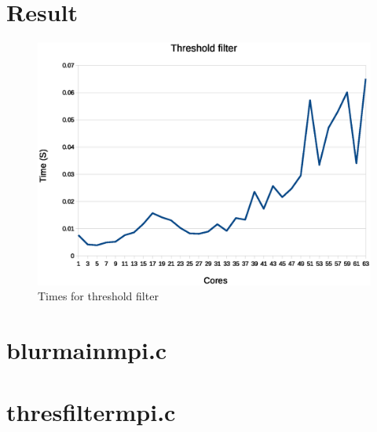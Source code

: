 \documentclass[10pt,twocolumn]{article}
\begin{document}
\section{Result}
\begin{figure}[H]
	\begin{center}
		\includegraphics[scale=0.4]{figurer/thres.eps}
	\end{center}
	\caption{Times for threshold filter}
\end{figure}

\newpage

\onecolumn
\appendix
\section{blurmainmpi.c} \label{app:blur}


\section{thresfiltermpi.c} \label{app:blur}

\end{document}
